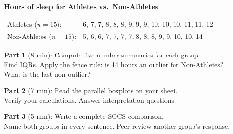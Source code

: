 \documentclass[aspectratio=169, 11pt]{beamer}
\begin{document}
{
\begin{frame}[t, plain]
  \vspace{0.45cm}\par
  \hspace{0.55cm}%
  \begin{minipage}{0.9\textwidth}
    \small
    \textbf{Hours of sleep for Athletes vs.\ Non-Athletes}\\[0.2em]
    \begin{tabular}{ll}
    Athletes ($n=15$):     & 6, 7, 7, 8, 8, 8, 9, 9, 9, 10, 10, 10, 11, 11, 12 \\
    Non-Athletes ($n=15$): & 5, 6, 6, 7, 7, 7, 7, 8, 8, 8, 9, 9, 10, 10, 14 \\
    \end{tabular}

    \vspace{0.5em}
    \textbf{Part 1} (8 min): Compute five-number summaries for each group.\\
    Find IQRs. Apply the fence rule: is 14 hours an outlier for Non-Athletes?\\
    What is the last non-outlier?

    \vspace{0.4em}
    \textbf{Part 2} (7 min): Read the parallel boxplots on your sheet.\\
    Verify your calculations. Answer interpretation questions.

    \vspace{0.4em}
    \textbf{Part 3} (5 min): Write a complete SOCS comparison.\\
    Name both groups in every sentence. Peer-review another group's response.
  \end{minipage}
\end{frame}
}
\end{document}
